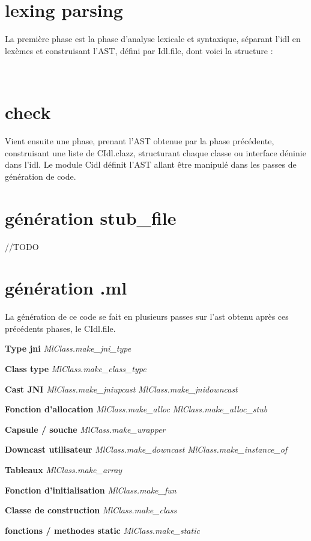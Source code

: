 \documentclass[a4paper, 11pt]{report}
\begin{document}
\section{lexing parsing}
La première phase est la phase d'analyse lexicale et syntaxique,
séparant l'idl en lexèmes et construisant l'AST, défini par Idl.file,
dont voici la structure :

\ 
\newline
\section{check}

Vient ensuite une phase, prenant l'AST obtenue par la
phase précédente, construisant une liste de CIdl.clazz, structurant
chaque classe ou interface déninie dans l'idl. 
Le module Cidl définit l'AST allant être manipulé dans les passes de
génération de code.

\section{génération stub\_file}
//TODO
\section{génération .ml}

La génération de ce code se fait en plusieurs passes sur l'ast obtenu
après ces précédents phases, le CIdl.file.

\textbf{Type jni}
\emph{MlClass.make\_jni\_type}

\textbf{Class type}
\emph{MlClass.make\_class\_type}

\textbf{Cast JNI}
\emph{MlClass.make\_jniupcast}
\emph{MlClass.make\_jnidowncast}

\textbf{Fonction d'allocation}
\emph{MlClass.make\_alloc}
\emph{MlClass.make\_alloc\_stub}

\textbf{Capsule / souche}
\emph{MlClass.make\_wrapper}

\textbf{Downcast utilisateur}
\emph{MlClass.make\_downcast}
\emph{MlClass.make\_instance\_of}

\textbf{Tableaux}
\emph{MlClass.make\_array}

\textbf{Fonction d'initialisation}
\emph{MlClass.make\_fun}

\textbf{Classe de construction}
\emph{MlClass.make\_class}



\textbf{fonctions / methodes static}
\emph{MlClass.make\_static}
\end{document}

